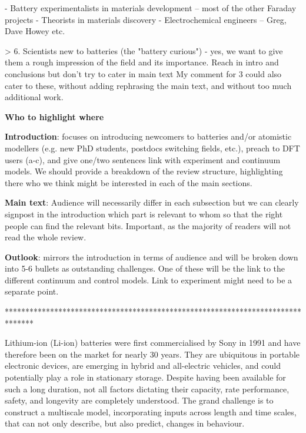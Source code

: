 \documentclass[../main.tex]{subfiles}
\begin{document}
- Battery experimentalists in materials development – most of the other Faraday projects
- Theorists in materials discovery
- Electrochemical engineers – Greg, Dave Howey etc.

> 6. Scientists new to batteries (the "battery curious") - yes, we want to give them a rough impression of the field and its importance. Reach in intro and conclusions but don’t try to cater in main text
My comment for 3 could also cater to these, without adding rephrasing the main text, and without too much additional work.

\textbf{Who to highlight where}

\textbf{Introduction}: focuses on introducing newcomers to batteries and/or atomistic modellers (e.g. new PhD students, postdocs switching fields, etc.), preach to DFT users (a-c), and give one/two sentences link with experiment and continuum models. We should provide a breakdown of the review structure, highlighting there who we think might be interested in each of the main sections.

\textbf{Main text}: Audience will necessarily differ in each subsection but we can clearly signpost in the introduction which part is relevant to whom so that the right people can find the relevant bits. Important, as the majority of readers will not read the whole review.

\textbf{Outlook}: mirrors the introduction in terms of audience and will be broken down into 5-6 bullets as outstanding challenges. One of these will be the link to the different continuum and control models. Link to experiment might need to be a separate point.


*******************************************************************************



Lithium-ion (Li-ion) batteries were first commercialised by Sony in 1991 and have therefore been on the market for nearly 30 years. They are ubiquitous in portable electronic devices, are emerging in hybrid and all-electric vehicles, and could potentially play a role in stationary storage. Despite having been available for such a long duration, not all factors dictating their capacity, rate performance, safety, and longevity are completely understood. The grand challenge is to construct a multiscale model, incorporating inputs across length and time scales, that can not only describe, but also predict, changes in behaviour.
\end{document}
